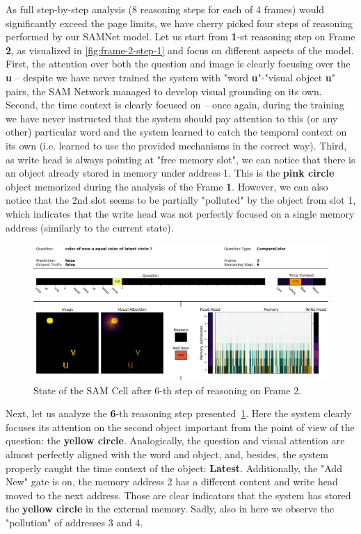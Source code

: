 As full step-by-step analysis (8 reasoning steps for each of 4 frames) would significantly exceed the page limits, we have cherry picked four steps of reasoning performed by our SAMNet model.
Let us start from \textbf{1}-st reasoning step on Frame \textbf{2}, as visualized in \cref{fig:frame-2-step-1} and focus on different aspects of the model.
First, the attention over both the question and image is clearly focusing over the \textbf{u} -- despite we have never trained the system with "word \textbf{u}"-"visual object \textbf{u}" pairs, the SAM Network managed to develop visual grounding on its own.
Second, the time context is clearly focused on  -- once again, during the training we have never instructed that the system should pay attention to this (or any other) particular word and the system learned to catch the temporal context on its own (i.e. learned to use the provided mechanisms in the correct way).
Third, as write head is always pointing at "free memory slot", we can notice that there is an object already stored in memory under address 1.
This is the \textbf{pink circle} object memorized during the analysis of the Frame \textbf{1}.
However, we can also notice that the 2nd slot seems to be partially "polluted" by the object from slot 1, which indicates that the write head was not perfectly focused on a single memory address (similarly to the current state).


\begin{figure}[!h]
\centering
  \includegraphics[width=\textwidth]{"../img/visualization/sample 2/Frame 2 Step 6"}
\caption{State of the SAM Cell after 6-th step of reasoning on Frame 2.} 
\label{fig:frame-2-step-6}
\end{figure}

Next, let us analyze the \textbf{6}-th reasoning step presented~\cref{fig:frame-2-step-6}.
Here the system clearly focuses its attention on the second object important from the point of view of the question: the \textbf{yellow circle}.
Analogically, the question and visual attention are almost perfectly aligned with the word and object, and, besides, the system  properly caught the time context of the object: \textbf{Latest}.
Additionally, the "Add New" gate is on, the memory address 2 has a different content and write head moved to the next address.
Those are clear indicators that the system has stored the \textbf{yellow circle} in the external memory.
Sadly, also  in here we observe the "pollution" of addresses 3 and 4.

